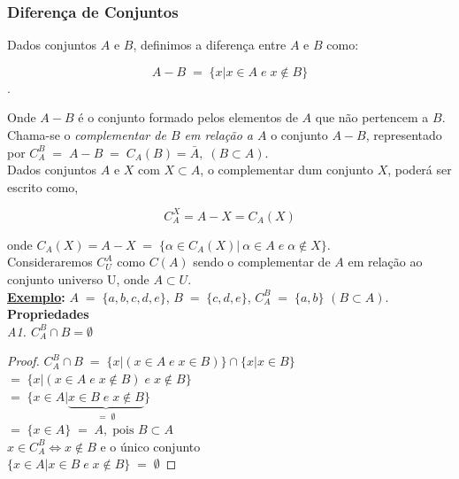 \subsubsection{Diferença de Conjuntos}


Dados conjuntos $A$ e $B$, definimos a diferença entre $A$ e $B$ como: 

	$$ A - B \; = \; \{ x | x \in A \; e \; x \notin B  \} $$.
	
Onde $A - B$ é o conjunto formado pelos elementos de $A$ que não pertencem a $B$. Chama-se o \textit{complementar de $B$ em relação a $A$} o conjunto $A - B$, representado por $C_A^B \; = \; A - B \; = \; C_A(B) = \bar{A}, \; (B \subset A) $. \\

\noindent
\text{\maltese } Dados conjuntos $A$ e $X$ com $ X \subset A  $, o complementar dum conjunto  $X$, poderá ser escrito como, 

$$ C_A^X = A - X = C_A(X) $$

onde $C_A(X) = A - X  \; = \; \{\alpha \in C_A(X)| \ \alpha \in A \; e \; \alpha \notin X \} $. \\

\text{\maltese} Consideraremos $C_U^A$ como $C(A)$ sendo o complementar de $A$ em relação ao conjunto universo U, onde $A \subset U$. \\

\noindent
\textbf{\underline{Exemplo}:}
	$ A \; = \; \{ a,b,c,d,e \}$, $B \; = \; \{ c,d,e \}$, $C_A^B \; = \; \{ a, b \}$ $(B \subset A)$. \\
	
	\noindent
	\textbf{Propriedades}
	\\
	
	\emph{A1. $ C_A^B \cap B = \emptyset $}
	\begin{proof}
		$ C_A^B \cap B \; = \; \{ x | (x \in A \; e \; x \in B) \} \cap \{ x | x \in B \} $\\

 		$ = \; \{ x | (x \in A \; e \; x \notin B) \; e \; x \notin B \} $\\

		$ =\; \{ x \in A | \underbrace{ x \in B \; e \; x \notin B}_{  = \; \emptyset } \} $\\ 

		$ = \; \{x \in A  \} \; = \; A, \; \text{pois } B \subset A $ \\

		$ x  \in C_A^B \Leftrightarrow x \notin B $ e o único conjunto \\

		$ \{ x \in A | x \in B \; e \; x \notin B \} \; = \; \emptyset $
	\end{proof}
	

